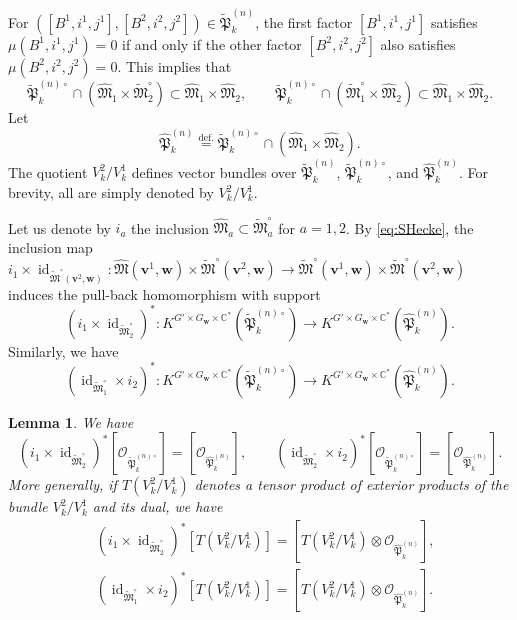 \documentclass[12pt]{amsart}
\def\Bbb{\mathbb}
\def\frak{\mathfrak}
\newtheorem{Lemma}[equation]{Lemma}
\theoremstyle{definition}
\theoremstyle{remark}
\numberwithin{equation}{subsection}
\newcommand{\defeq}{\overset{\operatorname{\scriptstyle def.}}{=}}
\newcommand{\C}{{\Bbb C}}
\newcommand{\id}{\operatorname{id}}
\newcommand{\M}{{\frak M}} %
\newcommand{\bv}{{\mathbf v}} %
\newcommand{\bw}{{\mathbf w}} %
\newcommand{\Pa}{{\frak P}} %
\newcommand{\shfO}{\mathcal O}
\newcommand{\Mp}{\widetilde\M}
\newcommand{\Mpp}{\widehat\M}
\begin{document}
For $([B^1,i^1,j^1], [B^2,i^2,j^2])\in \widetilde\Pa_{k}^{(n)}$,
the first factor $[B^1,i^1,j^1]$ satisfies $\mu(B^1,i^1,j^1) = 0$ if and
only if the other factor $[B^2,i^2,j^2]$ also satisfies
$\mu(B^2,i^2,j^2) = 0$. This implies that
\begin{equation}
\label{eq:SHecke}
  \widetilde\Pa_{k}^{(n)\circ}\cap
  \left(\Mpp_1\times\Mp^\circ_2\right)
  \subset \Mpp_1\times\Mpp_2, \qquad
%
  \widetilde\Pa_{k}^{(n)\circ}\cap
  \left(\Mp^\circ_1\times\Mpp_2\right)
  \subset \Mpp_1\times\Mpp_2.
\end{equation}
Let
\begin{equation*}
  \widehat\Pa_{k}^{(n)}
  \defeq \widetilde\Pa_{k}^{(n)\circ}\cap
  \left(\Mpp_1\times\Mpp_2\right).
\end{equation*}
The quotient $V^2_k/V^1_k$ defines vector bundles over
$\widetilde\Pa_{k}^{(n)}$, $\widetilde\Pa_{k}^{(n)\circ}$, and
$\widehat\Pa_{k}^{(n)}$. For brevity, all are simply denoted by
$V^2_k/V^1_k$.

Let us denote by $i_a$ the inclusion $\Mpp_a\subset \Mp^\circ_a$ for
$a=1,2$.  By \eqref{eq:SHecke}, the inclusion map $i_1\times
\id_{\Mp^\circ(\bv^2,\bw)}\colon
\Mpp(\bv^1,\bw)\times\Mp^\circ(\bv^2,\bw)\to
\Mp^\circ(\bv^1,\bw)\times\Mp^\circ(\bv^2,\bw)$ induces the
pull-back homomorphism with support
\begin{equation*}
  (i_1\times \id_{\Mp^\circ_2})^*
  \colon K^{G'\times G_\bw\times\C^*}
  (\widetilde\Pa_{k}^{(n)\circ})\to
  K^{G'\times G_\bw\times\C^*}(\widehat\Pa_{k}^{(n)}).
\end{equation*}
Similarly, we have
\begin{equation*}
  (\id_{\Mp^\circ_1}\times i_2)^*
  \colon K^{G'\times G_\bw\times\C^*}
  (\widetilde\Pa_{k}^{(n)\circ})\to
  K^{G'\times G_\bw\times\C^*}(\widehat\Pa_{k}^{(n)}).
\end{equation*}

\begin{Lemma}\label{lem:pullbackSHecke}
We have
\begin{equation*}
  (i_1\times \id_{\Mp^\circ_2})^*
  [\shfO_{\widetilde\Pa_{k}^{(n)\circ}}]
  = [\shfO_{\widehat\Pa_{k}^{(n)}}], \qquad
  (\id_{\Mp^\circ_2}\times i_2)^*
  [\shfO_{\widetilde\Pa_{k}^{(n)\circ}}]
  = [\shfO_{\widehat\Pa_{k}^{(n)}}].
\end{equation*}
More generally, if $T(V^2_k/V^1_k)$ denotes a tensor product of
exterior products of the bundle $V^2_k/V^1_k$ and its dual, we have
\begin{equation*}
\begin{split}
  & (i_1\times \id_{\Mp^\circ_2})^*
  [T\!\left(V^2_k/V^1_k\right)]
  = [T\!\left(V^2_k/V^1_k\right)\otimes \shfO_{\widehat\Pa_{k}^{(n)}}],\\
  & (\id_{\Mp^\circ_1}\times i_2)^*
  [T\!\left(V^2_k/V^1_k\right)]
  = [T\!\left(V^2_k/V^1_k\right)\otimes \shfO_{\widehat\Pa_{k}^{(n)}}].
\end{split}
\end{equation*}
\end{Lemma}
\end{document}
